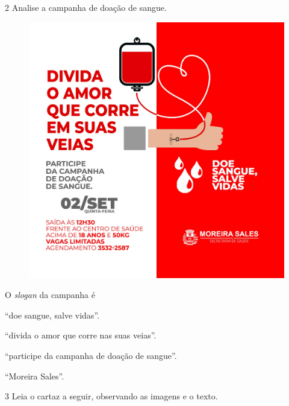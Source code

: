\num{2} Analise a campanha de doação de sangue.

\begin{figure}[htpb!]
\centering
\includegraphics[width=.6\textwidth]{media/image18.jpeg}
\end{figure}

O \emph{slogan} da campanha é

\begin{escolha}
\item ``doe sangue, salve vidas''.

\item ``divida o amor que corre nas suas veias''.

\item ``participe da campanha de doação de sangue''.

\item ``Moreira Sales''.
\end{escolha}

\pagebreak
\num{3} Leia o cartaz a seguir, observando as imagens e o texto. 


